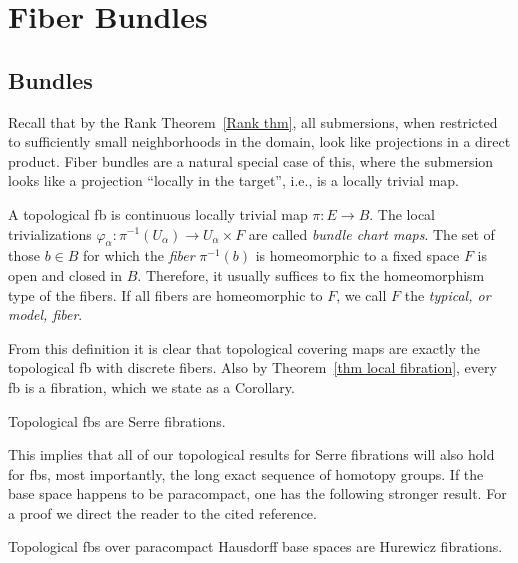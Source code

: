 
\chapter{Fiber Bundles}\label{chap: Fiber bundles}

\section{Bundles}

Recall that by the Rank Theorem~\ref{Rank thm}, all submersions, when restricted to sufficiently small neighborhoods in the domain, look like projections in a direct product. Fiber bundles are a natural special case of this, where the submersion looks like a projection ``locally in the target'', i.e., is a locally trivial map. 

\begin{defn}
    A topological \gls{fb} is continuous locally trivial map $\pi:E\to B$. The local trivializations $\varphi_\alpha:\pi^{-1}(U_\alpha)\to U_\alpha\times F$ are called \emph{bundle chart maps}. The set of those $b\in B$ for which the \emph{fiber} $\pi^{-1}(b)$ is homeomorphic to a fixed space $F$ is open and closed in $B$. Therefore, it usually suffices to fix the homeomorphism type of the fibers. If all fibers are homeomorphic to $F$, we call $F$ the \emph{typical, or model, fiber}.
\end{defn}

From this definition it is clear that topological covering maps are exactly the topological \gls{fb} with discrete fibers. Also by Theorem~\ref{thm local fibration}, every \gls{fb} is a fibration, which we state as a Corollary. 

\begin{cor}[{{\cite[Cor.~3.2.5]{RS2}}}]
    Topological \glspl{fb} are Serre fibrations.
\end{cor}

This implies that all of our topological results for Serre fibrations will also hold for \glspl{fb}, most importantly, the long exact sequence of homotopy groups. If the base space happens to be paracompact, one has the following stronger result. For a proof we direct the reader to the cited reference.

\begin{cor}
    Topological \glspl{fb} over paracompact Hausdorff base spaces are Hurewicz fibrations.
\end{cor}

